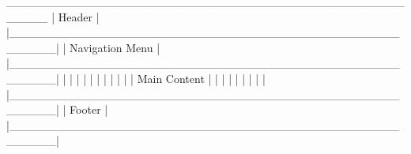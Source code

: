 _____________________________________________________
|                        Header                       |
|_____________________________________________________|
|                Navigation Menu                     |
|_____________________________________________________|
|                                                     |
|                                                     |
|                                                     |
|                                                     |
|                                                     |
|                    Main Content                     |
|                                                     |
|                                                     |
|                                                     |
|                                                     |
|_____________________________________________________|
|                    Footer                           |
|_____________________________________________________|

